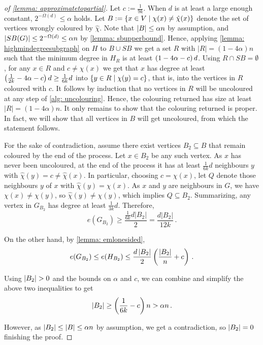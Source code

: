 \begin{proof}[of \cref{lemma: approximatetopartial}]
    Let $c:=\frac{1}{9k}$. When $d$ is at least a large enough constant, $2^{-\Omega(d)}\leq \alpha$ holds. Let $B:=\left\{x\in V\mid \chi(x)\neq \hat{\chi}(x)\right\}$ denote the set of vertices wrongly coloured by $\hat{\chi}$. Note that $\left\lvert B\right\rvert\leq \alpha n$ by assumption, and $\left\lvert SB(G)\right\rvert\leq 2^{-\Omega(d)}\leq \alpha n$ by \cref{lemma: sbupperbound}. Hence, applying \cref{lemma: highmindegreesubgraph} on $H$ to $B\cup SB$ we get a set $R$ with $|R|=(1-4\alpha)n$ such that the minimum degree in $H_R$ is at least $\left(1-4\alpha-c\right)d$. Using $R\cap SB=\emptyset$, for any $x\in R$ and $c\neq \chi(x)$ we get that $x$ has degree at least $\left(\frac{1}{2k}-4\alpha-c\right)d\geq \frac{1}{6k}d$ into $\left\{y\in R\mid \chi(y)=c\right\}$, that is, into the vertices in $R$ coloured with $c$. It follows by induction that no vertices in $R$ will be uncoloured at any step of \cref{alg: uncolouring}. Hence, the colouring returned has size at least $|R|=(1-4\alpha)n$. It only remains to show that the colouring returned is proper. In fact, we will show that all vertices in $B$ will get uncoloured, from which the statement follows.

    For the sake of contradiction, assume there exist vertices $B_2\subseteq B$ that remain coloured by the end of the process. Let $x\in B_2$ be any such vertex. As $x$ has never been uncoloured, at the end of the process it has at least $\frac{1}{6k}d$ neighbours $y$ with $\hat{\chi}(y)=c\neq \hat{\chi}(x)$. In particular, choosing $c=\chi(x)$, let $Q$ denote those neighbours $y$ of $x$ with $\hat{\chi}(y)=\chi(x)$. As $x$ and $y$ are neighbours in $G$, we have $\chi(x)\neq \chi(y)$, so $\hat{\chi}(y)\neq \chi(y)$, which implies $Q\subseteq B_2$. Summarizing, any vertex in $G_{B_2}$ has degree at least $\frac{1}{3k}d$. Therefore, $$e(G_{B_2})\geq \frac{\frac{1}{6k}d|B_2|}{2}= \frac{d|B_2|}{12k}\,.$$

    On the other hand, by \cref{lemma: emlonesided}, $$e(G_{B_2})\leq e(H_{B_2})\leq \frac{d\left\lvert B_2\right\rvert}{2}\left(\frac{\left\lvert B_2\right\rvert}{n}+c\right)\,.$$
    
    Using $\left\lvert B_2\right\rvert>0$ and the bounds on $\alpha$ and $c$, we can combine and simplify the above two inequalities to get $$\left\lvert B_2\right\rvert\geq \left(\frac{1}{6k}-c\right)n> \alpha n\,.$$

    However, as $\left\lvert B_2\right\rvert\leq \left\lvert B\right\rvert\leq \alpha n$ by assumption, we get a contradiction, so $\left\lvert B_2\right\rvert=0$ finishing the proof.
\end{proof}

